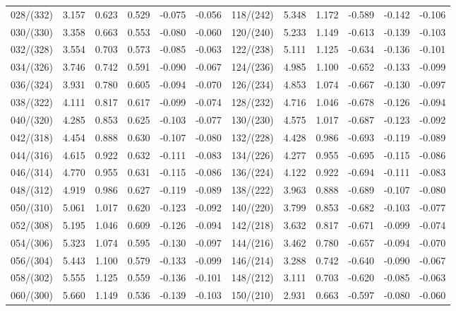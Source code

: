 \begin{table}
{\begin{tabular}{rrrrrr|rrrrrr}
028/(332) &  3.157 &  0.623 &  0.529 & -0.075 & -0.056 & 118/(242) &  5.348 &  1.172 & -0.589 & -0.142 & -0.106\\
030/(330) &  3.358 &  0.663 &  0.553 & -0.080 & -0.060 & 120/(240) &  5.233 &  1.149 & -0.613 & -0.139 & -0.103\\
032/(328) &  3.554 &  0.703 &  0.573 & -0.085 & -0.063 & 122/(238) &  5.111 &  1.125 & -0.634 & -0.136 & -0.101\\
034/(326) &  3.746 &  0.742 &  0.591 & -0.090 & -0.067 & 124/(236) &  4.985 &  1.100 & -0.652 & -0.133 & -0.099\\
036/(324) &  3.931 &  0.780 &  0.605 & -0.094 & -0.070 & 126/(234) &  4.853 &  1.074 & -0.667 & -0.130 & -0.097\\
038/(322) &  4.111 &  0.817 &  0.617 & -0.099 & -0.074 & 128/(232) &  4.716 &  1.046 & -0.678 & -0.126 & -0.094\\
040/(320) &  4.285 &  0.853 &  0.625 & -0.103 & -0.077 & 130/(230) &  4.575 &  1.017 & -0.687 & -0.123 & -0.092\\
042/(318) &  4.454 &  0.888 &  0.630 & -0.107 & -0.080 & 132/(228) &  4.428 &  0.986 & -0.693 & -0.119 & -0.089\\
044/(316) &  4.615 &  0.922 &  0.632 & -0.111 & -0.083 & 134/(226) &  4.277 &  0.955 & -0.695 & -0.115 & -0.086\\
046/(314) &  4.770 &  0.955 &  0.631 & -0.115 & -0.086 & 136/(224) &  4.122 &  0.922 & -0.694 & -0.111 & -0.083\\
048/(312) &  4.919 &  0.986 &  0.627 & -0.119 & -0.089 & 138/(222) &  3.963 &  0.888 & -0.689 & -0.107 & -0.080\\
050/(310) &  5.061 &  1.017 &  0.620 & -0.123 & -0.092 & 140/(220) &  3.799 &  0.853 & -0.682 & -0.103 & -0.077\\
052/(308) &  5.195 &  1.046 &  0.609 & -0.126 & -0.094 & 142/(218) &  3.632 &  0.817 & -0.671 & -0.099 & -0.074\\
054/(306) &  5.323 &  1.074 &  0.595 & -0.130 & -0.097 & 144/(216) &  3.462 &  0.780 & -0.657 & -0.094 & -0.070\\
056/(304) &  5.443 &  1.100 &  0.579 & -0.133 & -0.099 & 146/(214) &  3.288 &  0.742 & -0.640 & -0.090 & -0.067\\
058/(302) &  5.555 &  1.125 &  0.559 & -0.136 & -0.101 & 148/(212) &  3.111 &  0.703 & -0.620 & -0.085 & -0.063\\
060/(300) &  5.660 &  1.149 &  0.536 & -0.139 & -0.103 & 150/(210) &  2.931 &  0.663 & -0.597 & -0.080 & -0.060\\

\end{tabular}}
\end{table}

